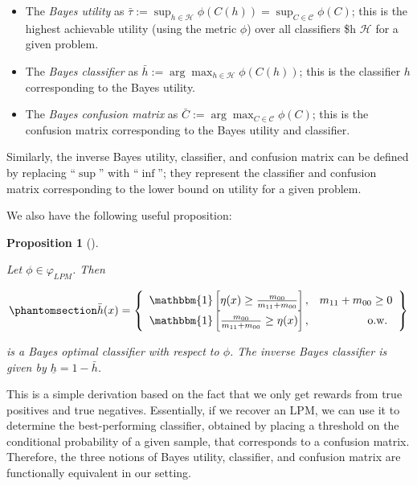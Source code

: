 \documentclass[
  letterpaper,
  numbers=noenddot,
  DIV=11]{scrreprt}
\providecommand{\tightlist}{%
  \setlength{\itemsep}{0pt}\setlength{\parskip}{0pt}}\usepackage{longtable,booktabs,array}
\theoremstyle{definition}
\theoremstyle{plain}
\theoremstyle{plain}
\newtheorem{proposition}{Proposition}[chapter]
\theoremstyle{remark}
\begin{document}
\begin{itemize}
\tightlist
\item
  The \emph{Bayes utility} as
  \(\bar{\tau} := \sup_{h \in \mathcal{H}} \phi(C(h)) = \sup_{C \in \mathcal{C}} \phi(C)\);
  this is the highest achievable utility (using the metric \(\phi\))
  over all classifiers \$h \in \(\mathcal{H}\) for a given problem.
\item
  The \emph{Bayes classifier} as
  \(\bar{h} := \arg \max_{h \in \mathcal{H}} \phi(C(h))\); this is the
  classifier \(h\) corresponding to the Bayes utility.
\item
  The \emph{Bayes confusion matrix} as
  \(\bar{C} := \arg \max_{C \in \mathcal{C}} \phi(C)\); this is the
  confusion matrix corresponding to the Bayes utility and classifier.
\end{itemize}

Similarly, the inverse Bayes utility, classifier, and confusion matrix
can be defined by replacing ``\(\sup\)'' with ``\(\inf\)''; they
represent the classifier and confusion matrix corresponding to the lower
bound on utility for a given problem.

We also have the following useful proposition:

\begin{tcolorbox}[colframe=.grey, title=\faPenSquare \enspace Proposition]

\begin{proposition}[]\protect\hypertarget{prp-prp3.1}{}\label{prp-prp3.1}

Let \(\phi \in \varphi_{LPM}\). Then

\begin{equation}\phantomsection\label{eq-eq3.46}{\bar{h}(x) = \left\{\begin{array}{lr}
\mathbbm{1}\left[\eta(x) \geq \frac{m_{00}}{m_{11} + m_{00}}\right], & m_{11} + m_{00} \geq 0 \\
\mathbbm{1}\left[\frac{m_{00}}{m_{11} + m_{00}} \geq \eta(x)\right], & \text { o.w. }
\end{array}\right\}}\end{equation}

is a Bayes optimal classifier with respect to \(\phi\). The inverse
Bayes classifier is given by \(\underline{h} = 1 - \bar{h}\).

\end{proposition}

\end{tcolorbox}

This is a simple derivation based on the fact that we only get rewards
from true positives and true negatives. Essentially, if we recover an
LPM, we can use it to determine the best-performing classifier, obtained
by placing a threshold on the conditional probability of a given sample,
that corresponds to a confusion matrix. Therefore, the three notions of
Bayes utility, classifier, and confusion matrix are functionally
equivalent in our setting.
\end{document}
